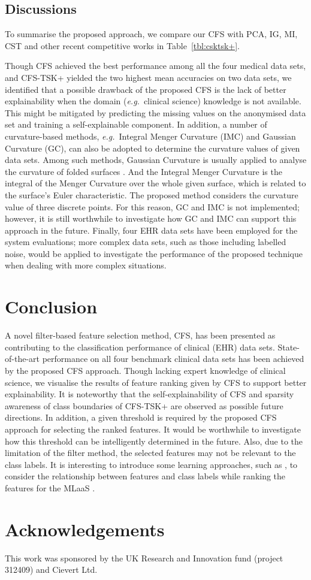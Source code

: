 \documentclass{article}
\newcommand{\zzeg}{\emph{e.g.}~}
\newcommand*{\1}{\textcolor{magenta}}
\begin{document}
	
	\subsection{Discussions}
	
	To summarise the proposed approach, we compare our CFS with PCA, IG, MI, CST and other recent competitive works in Table~\ref{tbl:csktsk+}. 
	
	Though CFS achieved the best performance among all the four medical data sets, and CFS-TSK+ yielded the two highest mean accuracies on two data sets, we identified that a possible drawback of the proposed CFS is the lack of better explainability when the domain (\zzeg clinical science) knowledge is not available. This might be mitigated by predicting the missing values on the anonymised data set and training a self-explainable component. In addition, a number of curvature-based methods, \zzeg Integral Menger Curvature (IMC) and Gaussian Curvature (GC), can also be adopted to determine the curvature values of given data sets. Among such methods, Gaussian Curvature is usually applied to analyse the curvature of folded surfaces \cite{richard1994detection}. And the Integral Menger Curvature is the integral of the Menger Curvature over the whole given surface, which is related to the surface's Euler characteristic. The proposed method considers the curvature value of three discrete points. For this reason, GC and IMC is not implemented; however, it is still worthwhile to investigate how GC and IMC can support this approach in the future. Finally, four EHR data sets have been employed for the system evaluations; more complex data sets, such as those including labelled noise, would be applied to investigate the performance of the proposed technique when dealing with more complex situations. 
	
	\section{Conclusion} \label{sec:concl}
	A novel filter-based feature selection method, CFS, has been presented as contributing to the classification performance of clinical (EHR) data sets. State-of-the-art performance on all four benchmark clinical data sets has been achieved by the proposed CFS approach. Though lacking expert knowledge of clinical science, we visualise the results of feature ranking given by CFS to support better explainability. It is noteworthy that the self-explainability of CFS and sparsity awareness of class boundaries of CFS-TSK+ are observed as possible future directions. In addition, a given threshold is required by the proposed CFS approach for selecting the ranked features. It would be worthwhile to investigate how this threshold can be intelligently determined in the future. Also, due to the limitation of the filter method, the selected features may not be relevant to the class labels. It is interesting to introduce some learning approaches, such as \cite{li2016experience}, to consider the relationship between features and class labels while ranking the features for the MLaaS \cite{chang2018overview}.
	
	\section*{Acknowledgements}
	This work was sponsored by the UK Research and Innovation fund (project 312409) and Cievert Ltd. 
	
	  
 
\end{document}
